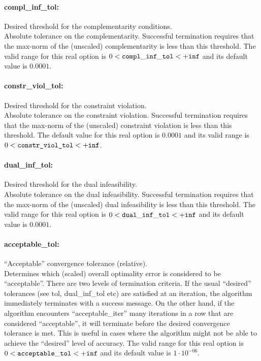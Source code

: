 \paragraph{compl\_inf\_tol:} Desired threshold for the complementarity conditions. $\;$ \\
 Absolute tolerance on the complementarity.
Successful termination requires that the max-norm
of the (unscaled) complementarity is less than
this threshold. The valid range for this real option is 
$0 <  {\tt compl\_inf\_tol } <  {\tt +inf}$
and its default value is $0.0001$.


\paragraph{constr\_viol\_tol:} Desired threshold for the constraint violation. $\;$ \\
 Absolute tolerance on the constraint violation.
Successful termination requires that the max-norm
of the (unscaled) constraint violation is less
than this threshold. The default value for this real option is $0.0001$ and its
valid range is $0<\texttt{constr\_viol\_tol}<{\tt +inf}$.


\paragraph{dual\_inf\_tol:} Desired threshold for the dual infeasibility. $\;$ \\
 Absolute tolerance on the dual infeasibility.
Successful termination requires that the max-norm
of the (unscaled) dual infeasibility is less than
this threshold. The valid range for this real option is 
$0 <  {\tt dual\_inf\_tol } <  {\tt +inf}$
and its default value is $0.0001$.


\paragraph{acceptable\_tol:} ``Acceptable'' convergence tolerance (relative). $\;$ \\
 Determines which (scaled) overall optimality
error is considered to be ``acceptable''. There are
two levels of termination criteria.  If the usual
``desired'' tolerances (see tol, dual\_inf\_tol
etc) are satisfied at an iteration, the algorithm
immediately terminates with a success message. 
On the other hand, if the algorithm encounters
``acceptable\_iter'' many iterations in a row that
are considered ``acceptable'', it will terminate
before the desired convergence tolerance is met.
This is useful in cases where the algorithm might
not be able to achieve the ``desired'' level of
accuracy. The valid range for this real option is 
$0 <  {\tt acceptable\_tol } <  {\tt +inf}$
and its default value is $1 \cdot 10^{-06}$.

